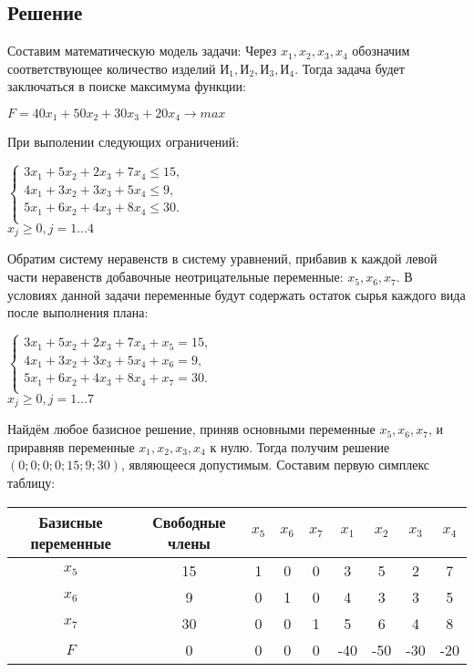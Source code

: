 \documentclass[12pt]{article}
\begin{document}
\subsection*{Решение}
Составим математическую модель задачи: 
Через $x_1, x_2, x_3, x_4$ обозначим соответствующее  количество изделий $И_1, И_2, И_3, И_4$. Тогда задача будет заключаться в поиске максимума функции: 
\begin{center}
$F=40x_1+50x_2 +30x_3 +20x_4\rightarrow max$
\end{center}
При выполении следующих ограничений:
\begin{center}
$\begin{cases}
  3x_1 +5x_2+2x_3  +7x_4\le 15,\\ 
  4x_1 +3x_2+3x_3  +5x_4\le 9,\\ 
  5x_1 +6x_2+4x_3  +8x_4\le 30.\\ 
\end{cases}$\\
$x_j\ge0,j =1...4$
\end{center}
Обратим систему неравенств в систему уравнений, прибавив к каждой левой части неравенств добавочные неотрицательные переменные: $x_5, x_6, x_7$. В условиях данной задачи переменные будут содержать остаток сырья каждого вида после выполнения плана:
\begin{center}
$\begin{cases}
  3x_1 +5x_2+2x_3  +7x_4 + x_5 = 15,\\ 
  4x_1 +3x_2+3x_3  +5x_4+ x_6 = 9,\\ 
  5x_1 +6x_2+4x_3  +8x_4+ x_7 =30.\\ 
\end{cases}$\\
$x_j\ge0,j =1...7$
\end{center}
\newpage
Найдём любое базисное решение, приняв основными переменные $x_5, x_6, x_7$, и приравняв переменные $x_1, x_2, x_3, x_4$ к нулю. Тогда получим решение $(0; 0; 0; 0; 15; 9; 30)$, являющееся допустимым. Составим первую симплекс таблицу:
\begin{table}[h!]
\begin{center}
\begin{tabular}{|c|c|c|c|c|c|c|c|c|}
\hline
Базисные переменные & Свободные члены & $x_5$ & $x_6$ & $x_7$ & $x_1$ & $x_2$ & $x_3$  & $x_4$ \\
\hline
		$x_5$	  & 		15 		 & 	1    &     0    &     0    &     3    &     5    &     2    &     7     \\
\hline
		$x_6$	  & 		9 		 & 	0    &     1    &     0    &     4    &     3    &     3    &     5     \\
\hline
		$x_7$	  & 		30		 & 	0    &     0    &     1    &     5    &     6    &     4    &     8    \\
\hline
	         $F$		  & 		0		 & 	0    &     0    &     0    &   -40   &   -50   &   -30   &   -20    \\
\hline
\end{tabular}
\end{center}
\end{table} 
\end{document}
